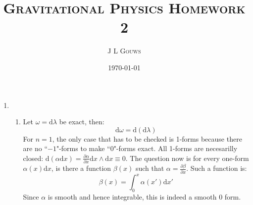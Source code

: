 \documentclass[12pt,a4]{article}
\title{
\textsc{Gravitational Physics Homework 2}
}
\author{\textsc{J L Gouws}
}
\date{\today
\\[1cm]}
\newcommand{\e}{\mathrm{d}}
\begin{document}
\thispagestyle{empty}

\maketitle

\begin{enumerate}
  \item
    \begin{enumerate}
      \item
        Let $\omega = \e \lambda$ be exact, then:
        \begin{equation*}
          \e \omega = \e( \e \lambda )
        \end{equation*}
        For $n = 1$, the only case that has to be checked is 1-forms because there are no ``$-1$"-forms to make ``0"-forms exact.
        All 1-forms are necesarilly closed: $\e (\alpha \e x) = \frac{\partial \alpha}{\partial x} \e x \wedge \e x \equiv 0$.
        The question now is for every one-form $\alpha(x) \e x$, is there a function $\beta(x)$ such that $\alpha = \frac{\partial \beta}{\partial x}$.
        Such a function is:
        \begin{equation*}
          \beta(x) = \int_0^x \alpha(x') \e x'
        \end{equation*}
        Since $\alpha$ is smooth and hence integrable, this is indeed a smooth $0$ form.


\end{enumerate}
\end{enumerate}
\end{document}
